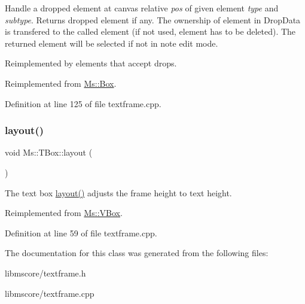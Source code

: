 Handle a dropped element at canvas relative {\itshape pos} of given element {\itshape type} and {\itshape subtype}. Returns dropped element if any. The ownership of element in Drop\+Data is transfered to the called element (if not used, element has to be deleted). The returned element will be selected if not in note edit mode.

Reimplemented by elements that accept drops. 

Reimplemented from \hyperlink{class_ms_1_1_box_ac1ec659f101990a90822f10edccdc2e6}{Ms\+::\+Box}.



Definition at line 125 of file textframe.\+cpp.

\mbox{\label{class_ms_1_1_t_box_a27cc5764749ca4d16fdd6eb1dc41d215}} 
\subsubsection{\texorpdfstring{layout()}{layout()}}
{\footnotesize\ttfamily void Ms\+::\+T\+Box\+::layout (\begin{DoxyParamCaption}{ }\end{DoxyParamCaption})\hspace{0.3cm}{\ttfamily [virtual]}}

The text box \hyperlink{class_ms_1_1_t_box_a27cc5764749ca4d16fdd6eb1dc41d215}{layout()} adjusts the frame height to text height. 

Reimplemented from \hyperlink{class_ms_1_1_v_box}{Ms\+::\+V\+Box}.



Definition at line 59 of file textframe.\+cpp.



The documentation for this class was generated from the following files\+:\begin{DoxyCompactItemize}
\item 
libmscore/textframe.\+h\item 
libmscore/textframe.\+cpp\end{DoxyCompactItemize}
